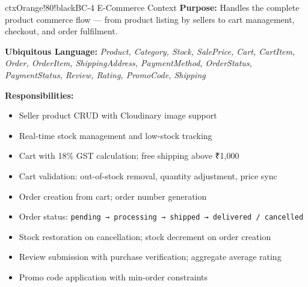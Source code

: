 \documentclass[12pt,a4paper]{article}
\begin{document}
\begin{contextbox}{ctxOrange!80!black}{BC-4 \quad E-Commerce Context}
\textbf{Purpose:} Handles the complete product commerce flow — from product listing by sellers to cart management, checkout, and order fulfilment.

\textbf{Ubiquitous Language:} \textit{Product, Category, Stock, SalePrice, Cart, CartItem, Order, OrderItem, ShippingAddress, PaymentMethod, OrderStatus, PaymentStatus, Review, Rating, PromoCode, Shipping}

\textbf{Responsibilities:}
\begin{itemize}
  \item Seller product CRUD with Cloudinary image support
  \item Real-time stock management and low-stock tracking
  \item Cart with 18\% GST calculation; free shipping above ₹1,000
  \item Cart validation: out-of-stock removal, quantity adjustment, price sync
  \item Order creation from cart; order number generation
  \item Order status: \texttt{pending → processing → shipped → delivered / cancelled}
  \item Stock restoration on cancellation; stock decrement on order creation
  \item Review submission with purchase verification; aggregate average rating
  \item Promo code application with min-order constraints
\end{itemize}
\end{contextbox}

\vspace{0.5em}
\end{document}
